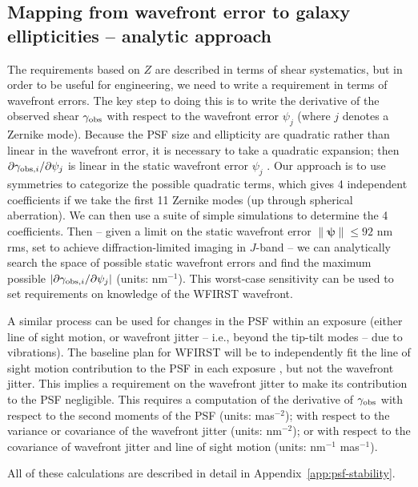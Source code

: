 \documentclass[aps,prd, amsmath,amssymb,superscriptaddress,showkeys,nofootinbib,reprint,preprintnumbers]{revtex4-1}
\begin{document}
\subsection{Mapping from wavefront error to galaxy ellipticities -- analytic approach}
\label{ss:dedZ}

The requirements based on $Z$ are described in terms of shear systematics, but in order to be useful for engineering, we need to write a requirement in terms of wavefront errors. The key step to doing this is to write the derivative of the observed shear $\gamma_{\rm obs}$ with respect to the wavefront error $\psi_j$ (where $j$ denotes a Zernike mode). Because the PSF size and ellipticity are quadratic rather than linear in the wavefront error, it is necessary to take a quadratic expansion; then $\partial\gamma_{{\rm obs},i}/\partial\psi_j$ is linear in the static wavefront error $\psi_j$ \cite{2010SPIE.7731E..1EN}. Our approach is to use symmetries to categorize the possible quadratic terms, which gives 4 independent coefficients if we take the first 11 Zernike modes (up through spherical aberration). We can then use a suite of simple simulations to determine the 4 coefficients. Then -- given a limit on the static wavefront error $\lVert{\boldsymbol\psi}\rVert \le 92$ nm rms, set to achieve diffraction-limited imaging in $J$-band -- we can analytically search the space of possible static wavefront errors and find the maximum possible $|\partial\gamma_{{\rm obs},i}/\partial\psi_j|$ (units: nm$^{-1}$). This worst-case sensitivity can be used to set requirements on knowledge of the WFIRST wavefront.

A similar process can be used for changes in the PSF within an exposure (either line of sight motion, or wavefront jitter -- i.e., beyond the tip-tilt modes -- due to vibrations). The baseline plan for WFIRST will be to independently fit the line of sight motion contribution to the PSF in each exposure \cite{2012SPIE.8442E..10J}, but not the wavefront jitter. This implies a requirement on the wavefront jitter to make its contribution to the PSF negligible. This requires a computation of the derivative of $\gamma_{\rm obs}$ with respect to the second moments of the PSF (units: mas$^{-2}$); with respect to the variance or covariance of the wavefront jitter (units: nm$^{-2}$); or with respect to the covariance of wavefront jitter and line of sight motion (units: nm$^{-1}$ mas$^{-1}$).

All of these calculations are described in detail in Appendix~\ref{app:psf-stability}.
\end{document}
